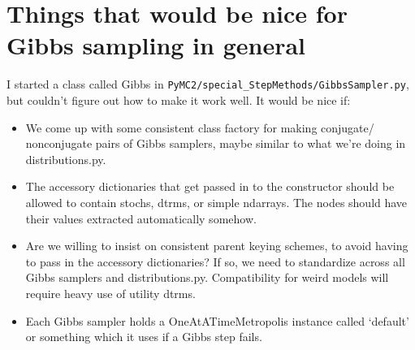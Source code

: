 \documentclass{article}
\begin{document}
\section{Things that would be nice for Gibbs sampling in general}
I started a class called Gibbs in \texttt{PyMC2/special\_StepMethods/GibbsSampler.py}, but couldn't figure out how to make it work well. It would be nice if:  
\begin{itemize}
	\item We come up with some consistent class factory for making conjugate/ nonconjugate pairs of Gibbs samplers, maybe similar to what we're doing in distributions.py.	
	\item The accessory dictionaries that get passed in to the constructor should be allowed to contain stochs, dtrms, or simple ndarrays. The nodes should have their values extracted automatically somehow.
	\item Are we willing to insist on consistent parent keying schemes, to avoid having to pass in the accessory dictionaries? If so, we need to standardize across all Gibbs samplers and distributions.py. Compatibility for weird models will require heavy use of utility dtrms.
	\item Each Gibbs sampler holds a OneAtATimeMetropolis instance called `default' or something which it uses if a Gibbs step fails.
\end{itemize} 
\end{document}
